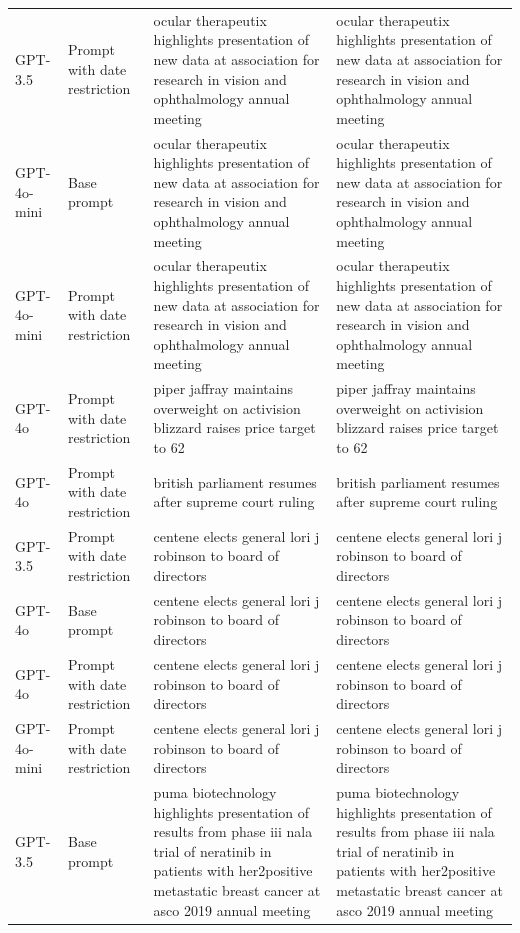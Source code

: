 \begin{longtable}{>{\raggedright\arraybackslash}p{1.4cm}>{\raggedright\arraybackslash}p{1.4cm}>{\raggedright\arraybackslash}p{5.5cm}>{\raggedright\arraybackslash}p{5.5cm}}
GPT-3.5 & Prompt with date restriction & ocular therapeutix highlights presentation of new data at association for research in vision and ophthalmology annual meeting & ocular therapeutix highlights presentation of new data at association for research in vision and ophthalmology annual meeting\\
GPT-4o-mini & Base prompt & ocular therapeutix highlights presentation of new data at association for research in vision and ophthalmology annual meeting & ocular therapeutix highlights presentation of new data at association for research in vision and ophthalmology annual meeting\\
GPT-4o-mini & Prompt with date restriction & ocular therapeutix highlights presentation of new data at association for research in vision and ophthalmology annual meeting & ocular therapeutix highlights presentation of new data at association for research in vision and ophthalmology annual meeting\\
GPT-4o & Prompt with date restriction & piper jaffray maintains overweight on activision blizzard raises price target to 62 & piper jaffray maintains overweight on activision blizzard raises price target to 62\\
GPT-4o & Prompt with date restriction & british parliament resumes after supreme court ruling & british parliament resumes after supreme court ruling\\
GPT-3.5 & Prompt with date restriction & centene elects general lori j robinson to board of directors & centene elects general lori j robinson to board of directors\\
GPT-4o & Base prompt & centene elects general lori j robinson to board of directors & centene elects general lori j robinson to board of directors\\
GPT-4o & Prompt with date restriction & centene elects general lori j robinson to board of directors & centene elects general lori j robinson to board of directors\\
GPT-4o-mini & Prompt with date restriction & centene elects general lori j robinson to board of directors & centene elects general lori j robinson to board of directors\\
GPT-3.5 & Base prompt & puma biotechnology highlights presentation of results from phase iii nala trial of neratinib in patients with her2positive metastatic breast cancer at asco 2019 annual meeting & puma biotechnology highlights presentation of results from phase iii nala trial of neratinib in patients with her2positive metastatic breast cancer at asco 2019 annual meeting\\

\end{longtable}
